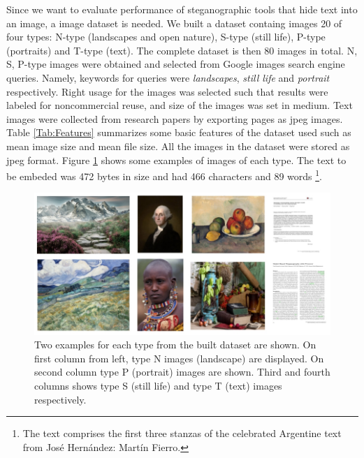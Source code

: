 \documentclass[11pt]{article}
\begin{document}
Since we want to evaluate performance of steganographic tools that hide text into an image, a image dataset is needed.
We built a dataset containg images 20 of four types: N-type (landscapes and open nature), S-type (still life), P-type (portraits) and
T-type (text). The complete dataset is then 80 images in total. N, S, P-type images were obtained and selected from Google images search engine queries.
Namely, keywords for queries were \textit{landscapes}, \textit{still life} and \textit{portrait} respectively.
Right usage for the images was selected such that results were labeled for noncommercial reuse, and size of the images was set in 
medium. Text images were collected from research papers by exporting pages as jpeg images.
Table \ref{Tab:Features} summarizes some basic features of the dataset used such as mean image size and mean file size. All the
images in the dataset were stored as jpeg format. Figure \ref{Fig:Dataset_example} shows some examples of images of each type.
The text to be embeded was 472 bytes in size and had 466 characters and 89 words \footnote{The text comprises the first three stanzas of the celebrated Argentine text from José Hernández: Martín Fierro.}.  

\begin{figure}[h]
\centering
\includegraphics[scale=0.5]{Dataset_example.jpeg}
\caption{Two examples for each type from the built dataset are shown. On first column from left, type N images (landscape) are displayed.
On second column type P (portrait) images are shown. Third and fourth columns shows type S (still life) and type T (text) images respectively. }
\label{Fig:Dataset_example}
\end{figure}
\end{document}
